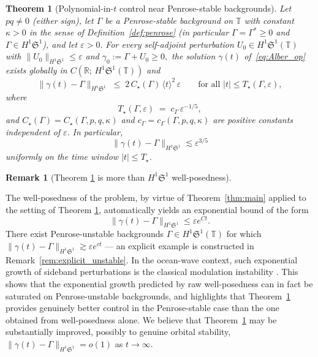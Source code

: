 \documentclass[11pt]{amsart}
\newtheorem{mainthm}{Theorem}
\theoremstyle{definition}
\newtheorem{remark}[theorem]{Remark}
\newcommand{\R}{\mathbb{R}}
\newcommand{\T}{\mathbb{T}}
\newcommand{\Sp}{\mathfrak{S}}
\begin{document}
\begin{mainthm}[Polynomial-in-$t$ control near Penrose-stable backgrounds]
\label{thm:nlstab}
Let $pq\ne 0$ (either sign), let $\Gamma$ be a Penrose-stable background on $\T$ with constant $\kappa>0$ in the sense of Definition~\ref{def:penrose} (in particular $\Gamma=\Gamma^*\ge 0$ and $\Gamma\in H^1\Sp^1$), and let $\varepsilon>0.$ For every self-adjoint perturbation $U_0\in H^1\Sp^1(\T)$ with $\|U_0\|_{H^1\Sp^1}\le\varepsilon$ and $\gamma_0:=\Gamma+U_0\ge 0,$ the solution $\gamma(t)$ of~\eqref{eq:Alber_op} exists globally in $C(\R;\,H^1\Sp^1(\T))$ and
\begin{equation}\label{eq:nlstab_bound}
  \|\gamma(t)-\Gamma\|_{H^1\Sp^1}
  \;\le\; 2\,C_\star(\Gamma)\,
  \langle t\rangle^2\,\varepsilon
  \qquad\text{for all }|t|\le T_\star(\Gamma,\varepsilon),
\end{equation}
where
\begin{equation}\label{eq:Tstar_def}
  T_\star(\Gamma,\varepsilon)
  \;=\; c_\Gamma\,\varepsilon^{-1/5},
\end{equation}
and $C_\star(\Gamma)=C_\star(\Gamma,p,q,\kappa)$ and $c_\Gamma=c_\Gamma(\Gamma,p,q,\kappa)$ are positive constants independent of $\varepsilon.$ In particular, 
\[
\|\gamma(t)-\Gamma\|_{H^1\Sp^1}\lesssim\varepsilon^{3/5}
\]
uniformly on the time window $|t|\le T_\star$.
\end{mainthm}

\begin{remark}[Theorem \ref{thm:nlstab} is more than $H^1\Sp^1$ well-posedness]
\label{rem:small_not_penrose}

 The well-posedness of the problem, by virtue of Theorem~\ref{thm:main} applied to the setting of Theorem \ref{thm:nlstab}, automatically yields an exponential bound of the form
 \[
\|\gamma(t)-\Gamma\|_{H^1\Sp^1}\le \varepsilon e^{Ct}.
 \]
There exist Penrose-unstable backgrounds $\Gamma\in H^1\Sp^1(\T)$ for which $\|\gamma(t)-\Gamma\|_{H^1\Sp^1}\gtrsim\varepsilon e^{ct}$ — an explicit example is constructed in Remark~\ref{rem:explicit_unstable}. In the ocean-wave context, such exponential growth of sideband perturbations is the classical modulation instability \cite{MI,ZakharovOstrovsky2009}. This shows that the exponential growth predicted by raw well-posedness can in fact be saturated on Penrose-unstable backgrounds, and highlights that Theorem~\ref{thm:nlstab} provides genuinely better control in the Penrose-stable case than the one obtained from well-posedness alone. We believe that Theorem~\ref{thm:nlstab} may be substantially improved, possibly to genuine orbital stability, $\|\gamma(t)-\Gamma\|_{H^1\Sp^1}=o(1)$ as $t\to\infty.$
\end{remark}
\end{document}
